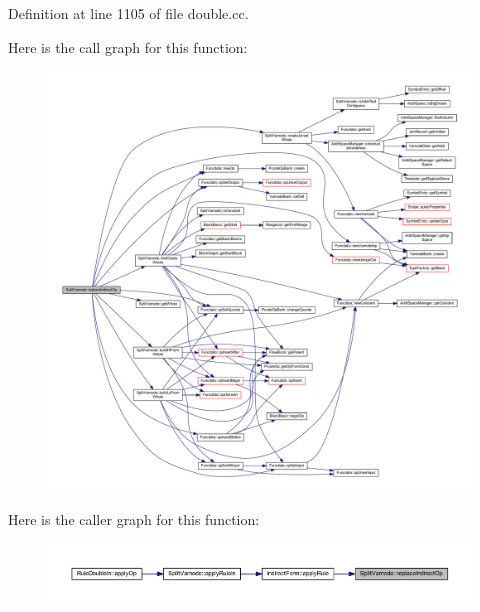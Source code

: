 Definition at line 1105 of file double.\+cc.

Here is the call graph for this function\+:
\nopagebreak
\begin{figure}[H]
\begin{center}
\leavevmode
\includegraphics[width=350pt]{class_split_varnode_abe58b89c66472db3c107fd338348e918_cgraph}
\end{center}
\end{figure}
Here is the caller graph for this function\+:
\nopagebreak
\begin{figure}[H]
\begin{center}
\leavevmode
\includegraphics[width=350pt]{class_split_varnode_abe58b89c66472db3c107fd338348e918_icgraph}
\end{center}
\end{figure}
\mbox{\label{class_split_varnode_a633feccdecafe2850128bbc8e530f24b}} 
